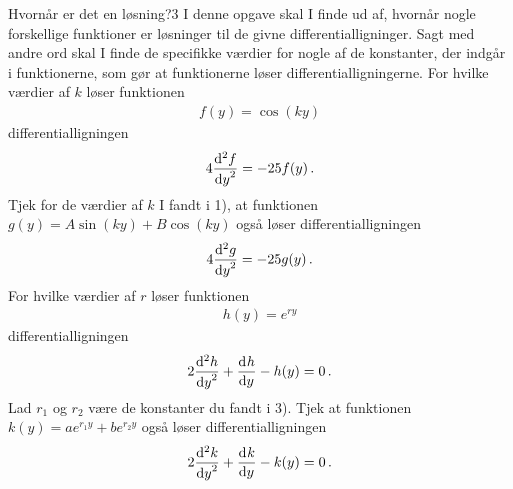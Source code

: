 \begin{opgave}{Hvornår er det en løsning?}{3}
	I denne opgave skal I finde ud af, hvornår nogle forskellige funktioner er løsninger til de givne differentialligninger. Sagt med andre ord skal I finde de specifikke værdier for nogle af de konstanter, der indgår i funktionerne, som gør at funktionerne løser differentialligningerne.
	\opg For hvilke værdier af $k$ løser funktionen
	\begin{align*}
	f(y) = \cos (ky)
	\end{align*}
	differentialligningen
	\begin{align*}
	4 \dif[2]{y}{f} = - 25f(y) \, .
	\end{align*}
	\opg Tjek for de værdier af $k$ I fandt i 1), at funktionen $g(y) = A \sin (ky) + B \cos (ky)$ også løser differentialligningen
	\begin{align*}
	4 \dif[2]{y}{g} = -25 g(y) \, .
	\end{align*}
	\opg For hvilke værdier af $r$ løser funktionen
	\begin{align*}
	h(y) = e^{ry}
	\end{align*}
	differentialligningen
	\begin{align*}
	2 \dif[2]{y}{h} + \dif{y}{h} - h(y) = 0 \, .
	\end{align*}
	\opg Lad $r_1$ og $r_2$ være de konstanter du fandt i 3). Tjek at funktionen $k (y) = ae^{r_1y} + be^{r_2y} $ også løser differentialligningen
	\begin{align*}
	2 \dif[2]{y}{k} + \dif{y}{k} - k(y) = 0 \, .
	\end{align*}
\end{opgave}

